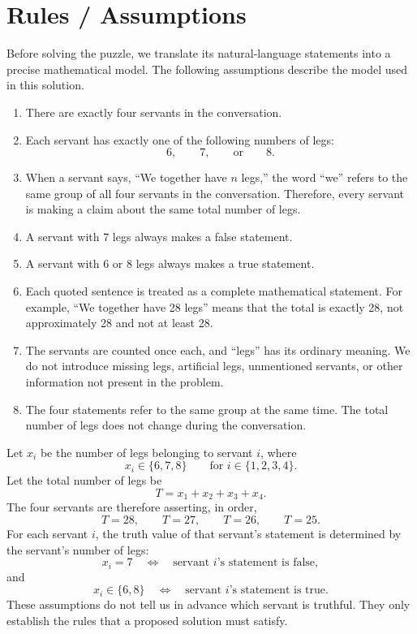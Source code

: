 \documentclass[11pt]{article}
\begin{document}
\section*{Rules / Assumptions} Before solving the puzzle, we translate its natural-language statements into a precise mathematical model. The following assumptions describe the model used in this solution. \begin{enumerate} \item There are exactly four servants in the conversation. \item Each servant has exactly one of the following numbers of legs: \[ 6,\qquad 7,\qquad \text{or}\qquad 8. \] \item When a servant says, ``We together have \(n\) legs,'' the word ``we'' refers to the same group of all four servants in the conversation. Therefore, every servant is making a claim about the same total number of legs. \item A servant with 7 legs always makes a false statement. \item A servant with 6 or 8 legs always makes a true statement. \item Each quoted sentence is treated as a complete mathematical statement. For example, ``We together have 28 legs'' means that the total is exactly 28, not approximately 28 and not at least 28. \item The servants are counted once each, and ``legs'' has its ordinary meaning. We do not introduce missing legs, artificial legs, unmentioned servants, or other information not present in the problem. \item The four statements refer to the same group at the same time. The total number of legs does not change during the conversation. \end{enumerate} Let \(x_i\) be the number of legs belonging to servant \(i\), where \[ x_i \in \{6,7,8\} \qquad\text{for } i\in\{1,2,3,4\}. \] Let the total number of legs be \[ T=x_1+x_2+x_3+x_4. \] The four servants are therefore asserting, in order, \[ T=28,\qquad T=27,\qquad T=26,\qquad T=25. \] For each servant \(i\), the truth value of that servant's statement is determined by the servant's number of legs: \[ x_i=7 \quad\Longleftrightarrow\quad \text{servant \(i\)'s statement is false}, \] and \[ x_i\in\{6,8\} \quad\Longleftrightarrow\quad \text{servant \(i\)'s statement is true}. \] These assumptions do not tell us in advance which servant is truthful. They only establish the rules that a proposed solution must satisfy.
\end{document}
